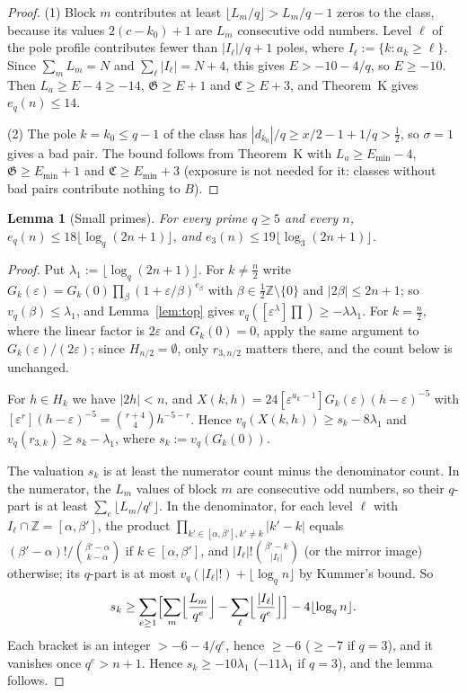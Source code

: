 \documentclass{amsart}
\newtheorem{lemma}[theorem]{Lemma}
\theoremstyle{definition}
\theoremstyle{remark}
\numberwithin{equation}{section}
\newcommand{\Z}{\mathbb{Z}}
\begin{document}
\begin{proof}
(1) Block $m$ contributes at least $\lfloor L_m/q\rfloor>L_m/q-1$ zeros to the
class, because its values $2(c-k_0)+1$ are $L_m$ consecutive odd numbers.
Level $\ell$ of the pole profile contributes fewer than $|I_\ell|/q+1$ poles,
where $I_\ell:=\{k:a_k\ge\ell\}$. Since $\sum_mL_m=N$ and
$\sum_\ell|I_\ell|=N+4$, this gives $E>-10-4/q$, so $E\ge-10$. Then
$L_a\ge E-4\ge-14$, $\mathfrak G\ge E+1$ and $\mathfrak C\ge E+3$, and
Theorem~K gives $e_q(n)\le14$.

(2) The pole $k=k_0\le q-1$ of the class has
$|d_{k_0}|/q\ge x/2-1+1/q>\frac12$, so $\sigma=1$ gives a bad pair. The bound
follows from Theorem~K with $L_a\ge E_{\min}-4$, $\mathfrak G\ge E_{\min}+1$
and $\mathfrak C\ge E_{\min}+3$ (exposure is not needed for it: classes
without bad pairs contribute nothing to $B$).
\end{proof}

\begin{lemma}[Small primes]\label{lem:small}
For every prime $q\ge5$ and every $n$, $e_q(n)\le18\lfloor\log_q(2n+1)\rfloor$,
and $e_3(n)\le19\lfloor\log_3(2n+1)\rfloor$.
\end{lemma}

\begin{proof}
Put $\lambda_1:=\lfloor\log_q(2n+1)\rfloor$. For $k\ne\frac n2$ write
$G_k(\varepsilon)=G_k(0)\prod_\beta(1+\varepsilon/\beta)^{e_\beta}$ with
$\beta\in\frac12\Z\setminus\{0\}$ and $|2\beta|\le2n+1$; so
$v_q(\beta)\le\lambda_1$, and Lemma~\ref{lem:top} gives
$v_q([\varepsilon^\lambda]\prod)\ge-\lambda\lambda_1$. For $k=\frac n2$, where
the linear factor is $2\varepsilon$ and $G_k(0)=0$, apply the same argument to
$G_k(\varepsilon)/(2\varepsilon)$; since $H_{n/2}=\emptyset$, only
$r_{3,n/2}$ matters there, and the count below is unchanged.

For $h\in H_k$ we have $|2h|<n$, and
$X(k,h)=24[\varepsilon^{a_k-1}]G_k(\varepsilon)(h-\varepsilon)^{-5}$ with
$[\varepsilon^r](h-\varepsilon)^{-5}=\binom{r+4}4h^{-5-r}$. Hence
$v_q(X(k,h))\ge s_k-8\lambda_1$ and $v_q(r_{3,k})\ge s_k-\lambda_1$, where
$s_k:=v_q(G_k(0))$.

The valuation $s_k$ is at least the numerator count minus the denominator
count. In the numerator, the $L_m$ values of block $m$ are consecutive odd
numbers, so their $q$-part is at least $\sum_e\lfloor L_m/q^e\rfloor$. In the
denominator, for each level $\ell$ with $I_\ell\cap\Z=[\alpha,\beta']$, the
product $\prod_{k'\in[\alpha,\beta'],k'\ne k}|k'-k|$ equals
$(\beta'-\alpha)!/\binom{\beta'-\alpha}{k-\alpha}$ if $k\in[\alpha,\beta']$,
and $|I_\ell|!\binom{\beta'-k}{|I_\ell|}$ (or the mirror image) otherwise; its
$q$-part is at most $v_q(|I_\ell|!)+\lfloor\log_qn\rfloor$ by Kummer's bound.
So
\[
  s_k\ge\sum_{e\ge1}\Bigl[\sum_m\Bigl\lfloor\frac{L_m}{q^e}\Bigr\rfloor-\sum_\ell\Bigl\lfloor\frac{|I_\ell|}{q^e}\Bigr\rfloor\Bigr]-4\lfloor\log_qn\rfloor .
\]
Each bracket is an integer $>-6-4/q^e$, hence $\ge-6$ ($\ge-7$ if $q=3$), and
it vanishes once $q^e>n+1$. Hence $s_k\ge-10\lambda_1$ ($-11\lambda_1$ if
$q=3$), and the lemma follows.
\end{proof}
\end{document}
